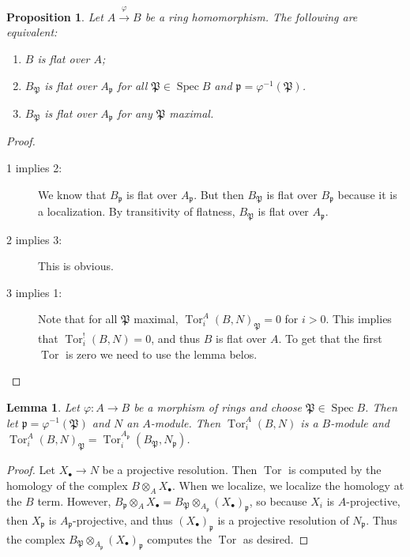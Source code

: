 \documentclass[leqno, openany]{memoir}
\newtheorem{prop}[thm]{Proposition}
\newtheorem{lem}[thm]{Lemma}
\theoremstyle{definition}
\theoremstyle{remark}
\theoremstyle{plain}
\theoremstyle{definition}
\theoremstyle{remark}
\newcommand{\mf}[1]{\mathfrak{#1}}
\DeclareMathOperator{\Spec}{Spec}
\DeclareMathOperator{\Tor}{Tor}
\begin{document}
\begin{prop} Let $A \xrightarrow{\varphi} B$ be a ring homomorphism. The
    following are equivalent: \begin{enumerate} \item $B$ is flat over $A$;
        \item $B_{\mf{P}}$ is flat over $A_{\mf{p}}$ for all $\mf{P} \in \Spec
            B$ and $\mf{p} = \varphi^{-1} (\mf{P})$.  \item $B_{\mf{P}}$ is
    flat over $A_{\mf{p}}$ for any $\mf{P}$ maximal.  \end{enumerate}
\end{prop}

\begin{proof} \begin{description} \item[1 implies 2:] We know that $B_{\mf{p}}$
    is flat over $A_{\mf{p}}$. But then $B_{\mf{P}}$ is flat over $B_{\mf{p}}$
    because it is a localization. By transitivity of flatness, $B_{\mf{P}}$ is
    flat over $A_{\mf{p}}$.  \item[2 implies 3:] This is obvious.  \item[3
    implies 1:] Note that for all $\mf{P}$ maximal, $\Tor_i^A(B,N)_{\mf{P}} =
    0$ for $i > 0$. This implies that $\Tor_i^!(B,N) = 0$, and thus $B$ is flat
    over $A$. To get that the first $\Tor$ is zero we need to use the lemma
    belos. \qedhere \end{description} \end{proof}

\begin{lem} Let $\varphi: A \to B$ be a morphism of rings and choose $\mf{P}
    \in \Spec B$. Then let $\mf{p} = \varphi^{-1}(\mf{P})$ and $N$ an
    $A$-module. Then $\Tor_i^A(B,N)$ is a $B$-module and
    $\Tor_i^A(B,N)_{\mf{P}} = \Tor_i^{A_{\mf{p}}}(B_\mf{P},N_{\mf{p}})$.
\end{lem}

\begin{proof} Let $X_{\bullet} \to N$ be a projective resolution. Then $\Tor$
    is computed by the homology of the complex $B \otimes_A X_{\bullet}$. When
    we localize, we localize the homology at the $B$ term. However, $B_{\mf{p}}
    \otimes_A X_{\bullet} = B_{\mf{P}} \otimes_{A_{\mf{p}}}
    (X_{\bullet})_{\mf{p}}$, so because $X_i$ is $A$-projective, then
    $X_{\mf{p}}$ is $A_{\mf{p}}$-projective, and thus $(X_{\bullet})_{\mf{p}}$
    is a projective resolution of $N_{\mf{p}}$. Thus the complex $B_{\mf{P}}
    \otimes_{A_{\mf{p}}} (X_{\bullet})_{\mf{p}}$ computes the $\Tor$ as
    desired.  \end{proof}
\end{document}
